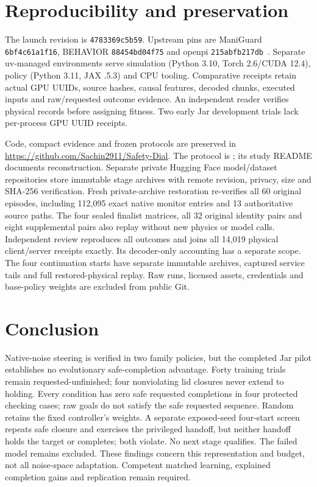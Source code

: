 \documentclass[sigconf,dvipsnames,balance=false]{acmart}
\begin{document}
\section{Reproducibility and preservation}
The launch revision is \texttt{4783369c5b59}. Upstream pins are ManiGuard
\texttt{6bf4c61a1f16}, BEHAVIOR \texttt{88454bd04f75} and openpi
\texttt{215abfb217db}~\cite{openpi}. Separate uv-managed environments serve
simulation (Python 3.10, Torch 2.6/CUDA 12.4), policy (Python 3.11, JAX .5.3) and
CPU tooling. Comparative receipts retain actual GPU UUIDs, source hashes, causal features,
decoded chunks, executed inputs and raw/requested outcome evidence. An independent
reader verifies physical records before assigning fitness. Two early Jar
development trials lack per-process GPU UUID receipts.

Code, compact evidence and frozen protocols are preserved in
\url{https://github.com/Sachin2911/Safety-Dial}. The protocol is
; its study README
documents reconstruction. Separate private Hugging Face model/dataset repositories
store immutable stage archives with remote revision, privacy, size and SHA-256
verification. Fresh private-archive restoration re-verifies all 60 original episodes,
including 112,095 exact native monitor entries and 13 authoritative source paths.
The four sealed finalist matrices, all 32 original identity pairs and eight
supplemental pairs also replay without new physics or model calls. Independent
review reproduces all outcomes and joins all 14,019 physical client/server
receipts exactly. Its decoder-only accounting has a separate scope. The four
continuation starts have separate immutable archives, captured service tails and
full restored-physical replay. Raw runs, licensed assets, credentials
and base-policy weights are excluded from public Git.

\section{Conclusion}
Native-noise steering is verified in two family policies, but the completed
Jar pilot establishes no evolutionary safe-completion advantage. Forty training
trials remain requested-unfinished; four nonviolating lid closures never extend
to holding. Every condition has zero safe requested completions in four protected
checking cases; raw goals do not satisfy the safe requested sequence. Random
retains the fixed controller's weights. A separate exposed-seed four-start screen
repeats safe closure and exercises the privileged handoff, but neither handoff
holds the target or completes; both violate. No next stage qualifies. The failed
model remains excluded. These findings
concern this representation and budget, not all noise-space adaptation. Competent
matched learning, explained completion gains and replication remain required.
\end{document}
